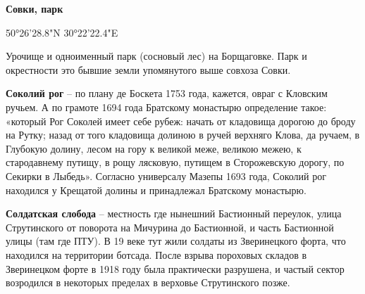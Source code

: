 \medskip

\textbf{Совки, парк}

50°26'28.8"N 30°22'22.4"E

Урочище и одноименный парк (сосновый лес) на Борщаговке. Парк и окрестности это бывшие земли упомянутого выше совхоза Совки.

\medskip





\textbf{Соколий рог} – по плану де Боскета 1753 года, кажется, овраг с Кловским ручьем. А по грамоте 1694 года Братскому монастырю определение такое: «который Рог Соколей имеет себе рубеж: начать от кладовища дорогою до броду на Рутку; назад от того кладовища долиною в ручей верхняго Клова, да ручаем, в Глубокую долину, лесом на гору к великой меже, великою межею, к стародавнему путищу, в рощу лясковую, путищем в Сторожевскую дорогу, по Секирки в Лыбедь». Согласно универсалу Мазепы 1693 года, Соколий рог находился у Крещатой долины и принадлежал Братскому монастырю.\\

\medskip

\textbf{Солдатская слобода} – местность где нынешний Бастионный переулок, улица Струтинского от поворота на Мичурина до Бастионной, и часть Бастионной улицы (там где ПТУ). В 19 веке тут жили солдаты из Зверинецкого форта, что находился на территории ботсада. После взрыва пороховых складов в Зверинецком форте в 1918 году была практически разрушена, и частый сектор возродился в некоторых пределах в верховье Струтинского позже.\\

